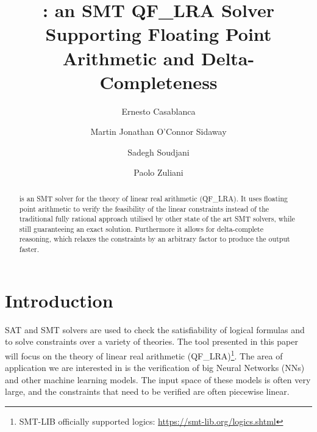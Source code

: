 \documentclass[runningheads]{llncs}
\begin{document}
\title{\dlinear: an SMT QF\_LRA Solver Supporting Floating Point Arithmetic and Delta-Completeness}
\titlerunning{\dlinear}

\author{Ernesto Casablanca \and
    Martin Jonathan O'Connor Sidaway \and
    Sadegh Soudjani \and
    Paolo Zuliani}




\maketitle

\begin{abstract}
    \dlinear is an SMT solver for the theory of linear real arithmetic (QF\_LRA).
    It uses floating point arithmetic to verify the feasibility of the linear constraints instead of the traditional fully rational approach utilised by other state of the art SMT solvers,
    while still guaranteeing an exact solution.
    Furthermore it allows for delta-complete reasoning, which relaxes the constraints by an arbitrary factor to produce the output faster.

\end{abstract}

\section{Introduction}

SAT and SMT solvers are used to check the satisfiability of logical formulas and to solve constraints over a variety of theories.
The tool presented in this paper will focus on the theory of linear real arithmetic (QF\_LRA)\footnote{SMT-LIB officially supported logics: \url{https://smt-lib.org/logics.shtml}}.
The area of application we are interested in is the verification of big Neural Networks (NNs) and other machine learning models.
The input space of these models is often very large, and the constraints that need to be verified are often piecewise linear.
\end{document}
